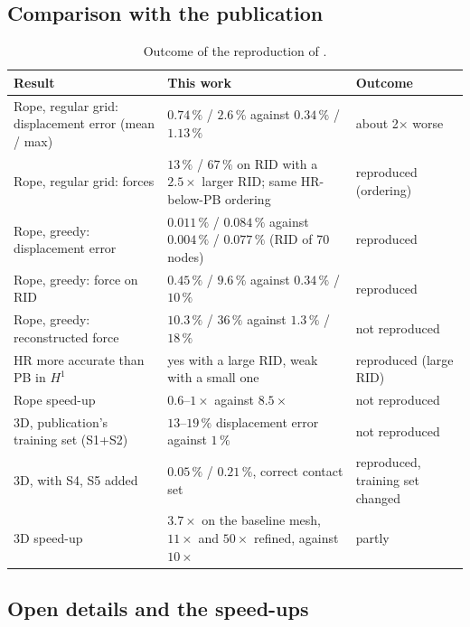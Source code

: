 \subsection*{Comparison with the publication}

\begin{table}[tbp]
\centering\footnotesize
\caption{Outcome of the reproduction of \citet{fauque2018hybrid}.}\label{tab:vf-hb-cmp}
\begin{tabularx}{\linewidth}{@{}>{\raggedright\arraybackslash}p{4.3cm} >{\raggedright\arraybackslash}X >{\raggedright\arraybackslash}p{2.4cm}@{}}
\toprule
Result & This work & Outcome\\
\midrule
Rope, regular grid: displacement error (mean / max) & $0.74\,\%$ / $2.6\,\%$ against $0.34\,\%$ / $1.13\,\%$ & about 2$\times$ worse\\
Rope, regular grid: forces & $13\,\%$ / $67\,\%$ on RID with a $2.5\times$ larger RID; same HR-below-PB ordering & reproduced (ordering)\\
Rope, greedy: displacement error & $0.011\,\%$ / $0.084\,\%$ against $0.004\,\%$ / $0.077\,\%$ (RID of 70 nodes) & reproduced\\
Rope, greedy: force on RID & $0.45\,\%$ / $9.6\,\%$ against $0.34\,\%$ / $10\,\%$ & reproduced\\
Rope, greedy: reconstructed force & $10.3\,\%$ / $36\,\%$ against $1.3\,\%$ / $18\,\%$ & not reproduced\\
HR more accurate than PB in $H^1$ & yes with a large RID, weak with a small one & reproduced (large RID)\\
Rope speed-up & $0.6$--$1\times$ against $8.5\times$ & not reproduced\\
3D, publication's training set (S1+S2) & $13$--$19\,\%$ displacement error against $1\,\%$ & not reproduced\\
3D, with S4, S5 added & $0.05\,\%$ / $0.21\,\%$, correct contact set & reproduced, training set changed\\
3D speed-up & $3.7\times$ on the baseline mesh, $11\times$ and $50\times$ refined, against $10\times$ & partly\\
\bottomrule
\end{tabularx}
\end{table}

\subsection*{Open details and the speed-ups}

